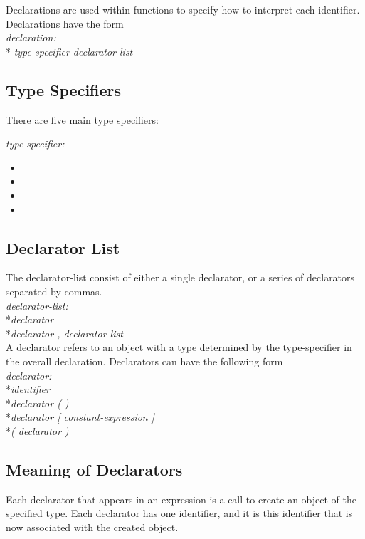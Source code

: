 Declarations are used within functions to specify how to interpret each identifier. Declarations have the form\\

	\textit{ declaration: }
		\\*\indent\indent\textit{ type-specifier declarator-list}

\subsection{Type Specifiers}

There are five main type specifiers:

	\textit{type-specifier: }
\begin{itemize}[~]
  \item \integ
  \item \float
  \item \complex
  \item \mat
\end{itemize}

\subsection{ Declarator List }
The declarator-list consist of either a single declarator, or a series of declarators separated by commas.\\

	\textit{declarator-list:}
		\\*\indent\indent\textit{declarator}
		\\*\indent\indent\textit{declarator , declarator-list}\\

A declarator refers to an object with a type determined by the type-specifier in the overall declaration. Declarators can have the following form\\

	\textit{declarator:}
		\\*\indent\indent\textit{identifier}
		\\*\indent\indent\textit{declarator ( )}
		\\*\indent\indent\textit{declarator [ constant-expression ]}
		\\*\indent\indent\textit{( declarator )}\\

\subsection{ Meaning of Declarators }
Each declarator that appears in an expression is a call to create an object of the specified type. Each declarator has one identifier, and it is this identifier that is now associated with the created object. 

